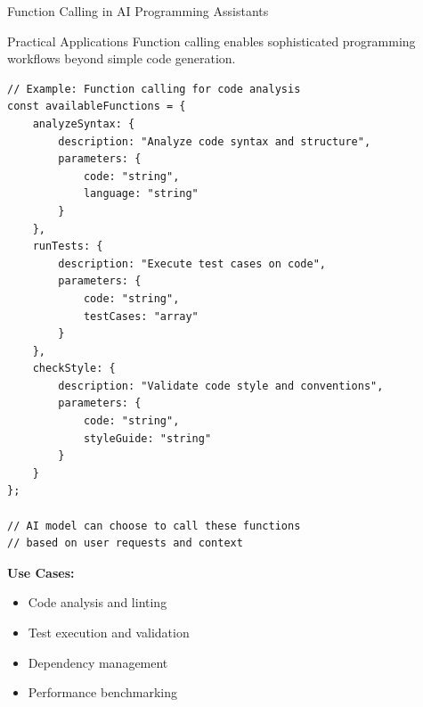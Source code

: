 \documentclass{beamer}
\begin{document}
\begin{frame}[t,fragile]{Function Calling in AI Programming Assistants}
    \begin{block}{Practical Applications}
        Function calling enables sophisticated programming workflows beyond simple code generation.
    \end{block}
    
    \begin{lstlisting}[style=code, basicstyle=\ttfamily\scriptsize]
// Example: Function calling for code analysis
const availableFunctions = {
    analyzeSyntax: {
        description: "Analyze code syntax and structure",
        parameters: {
            code: "string",
            language: "string"
        }
    },
    runTests: {
        description: "Execute test cases on code",
        parameters: {
            code: "string",
            testCases: "array"
        }
    },
    checkStyle: {
        description: "Validate code style and conventions",
        parameters: {
            code: "string",
            styleGuide: "string"
        }
    }
};

// AI model can choose to call these functions
// based on user requests and context
    \end{lstlisting}
    
    \textbf{Use Cases:}
    \begin{itemize}
        \item Code analysis and linting
        \item Test execution and validation
        \item Dependency management
        \item Performance benchmarking
    \end{itemize}
\end{frame}
\end{document}
